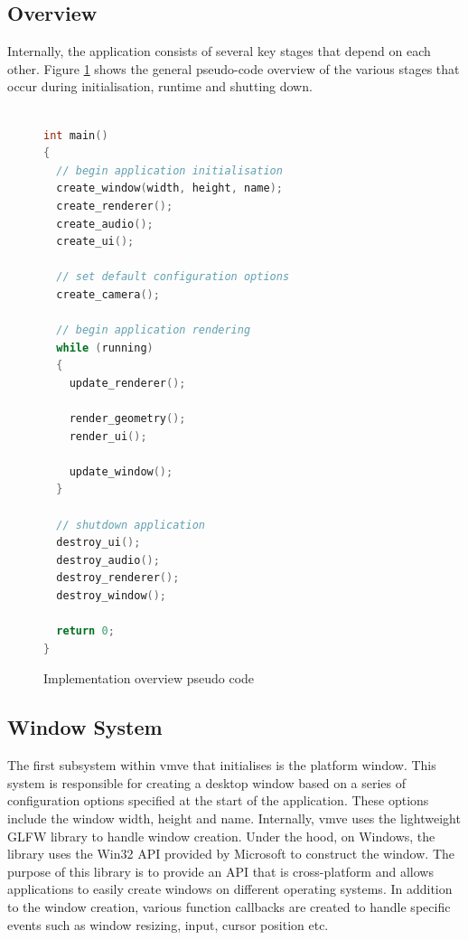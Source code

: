 \documentclass[11pt]{article}
\begin{document}


\subsection{Overview}
Internally, the application consists of several key stages that depend on each
other. Figure \ref{fig:overview_pseudo_code} shows the general pseudo-code
overview of the various stages that occur during initialisation, runtime and
shutting down.


\begin{figure}[H]
\centering
\begin{lstlisting}[language=C++]

int main()
{
  // begin application initialisation
  create_window(width, height, name);
  create_renderer();
  create_audio();
  create_ui();

  // set default configuration options
  create_camera();
  
  // begin application rendering
  while (running)
  {
    update_renderer();

    render_geometry();
    render_ui();

    update_window();
  }

  // shutdown application
  destroy_ui();
  destroy_audio();
  destroy_renderer();
  destroy_window();

  return 0;
}
\end{lstlisting}
\caption{Implementation overview pseudo code}
\label{fig:overview_pseudo_code}
\end{figure}

\subsection{Window System}
The first subsystem within \gls*{vmve} that initialises is the platform window.
This system is responsible for creating a desktop window based on a series of
configuration options specified at the start of the application. These options
include the window width, height and name. Internally, \gls*{vmve} uses the
lightweight GLFW library to handle window creation. Under the hood, on Windows,
the library uses the Win32 API provided by Microsoft to construct the window.
The purpose of this library is to provide an API that is cross-platform and
allows applications to easily create windows on different operating systems. In
addition to the window creation, various function callbacks are created to
handle specific events such as window resizing, input, cursor position etc.
\end{document}
